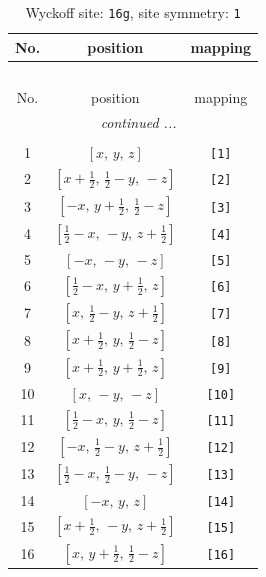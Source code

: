 \documentclass[fleqn,8pt]{jsarticle}
\begin{document}
\begin{longtable}{ccc}
\caption{Wyckoff site: {\tt 16g}, site symmetry: {\tt 1}}
 \\
 \hline \hline
No. & position & mapping \\ \hline \endfirsthead

\multicolumn{2}{l}{\tablename\ \thetable{}} \\
 \hline \hline
No. & position & mapping \\ \hline \endhead

 \hline \hline
\multicolumn{2}{r}{\footnotesize\it continued ...} \\ \endfoot

 \hline \hline
\multicolumn{2}{r}{} \\ \endlastfoot

1 & $\left[ x,\, y,\, z \right]$ & {\tt [1]} \\ \hline
2 & $\left[ x + \frac{1}{2},\, \frac{1}{2} - y,\, - z \right]$ & {\tt [2]} \\ \hline
3 & $\left[ - x,\, y + \frac{1}{2},\, \frac{1}{2} - z \right]$ & {\tt [3]} \\ \hline
4 & $\left[ \frac{1}{2} - x,\, - y,\, z + \frac{1}{2} \right]$ & {\tt [4]} \\ \hline
5 & $\left[ - x,\, - y,\, - z \right]$ & {\tt [5]} \\ \hline
6 & $\left[ \frac{1}{2} - x,\, y + \frac{1}{2},\, z \right]$ & {\tt [6]} \\ \hline
7 & $\left[ x,\, \frac{1}{2} - y,\, z + \frac{1}{2} \right]$ & {\tt [7]} \\ \hline
8 & $\left[ x + \frac{1}{2},\, y,\, \frac{1}{2} - z \right]$ & {\tt [8]} \\ \hline
9 & $\left[ x + \frac{1}{2},\, y + \frac{1}{2},\, z \right]$ & {\tt [9]} \\ \hline
10 & $\left[ x,\, - y,\, - z \right]$ & {\tt [10]} \\ \hline
11 & $\left[ \frac{1}{2} - x,\, y,\, \frac{1}{2} - z \right]$ & {\tt [11]} \\ \hline
12 & $\left[ - x,\, \frac{1}{2} - y,\, z + \frac{1}{2} \right]$ & {\tt [12]} \\ \hline
13 & $\left[ \frac{1}{2} - x,\, \frac{1}{2} - y,\, - z \right]$ & {\tt [13]} \\ \hline
14 & $\left[ - x,\, y,\, z \right]$ & {\tt [14]} \\ \hline
15 & $\left[ x + \frac{1}{2},\, - y,\, z + \frac{1}{2} \right]$ & {\tt [15]} \\ \hline
16 & $\left[ x,\, y + \frac{1}{2},\, \frac{1}{2} - z \right]$ & {\tt [16]} \\
\end{longtable}
\end{document}
